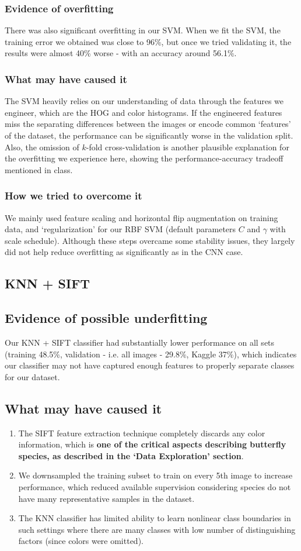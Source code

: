 \documentclass[10pt]{article} %
\begin{document}
\subsubsection{Evidence of overfitting}
There was also significant overfitting in our SVM. When we fit the SVM, the training error we obtained was close to 96\%, but once we tried validating it, the results were almost 40\% worse - with an accuracy around 56.1\%. 
\subsubsection{What may have caused it}
The SVM heavily relies on our understanding of data through the features we engineer, which are the HOG and color histograms. If the engineered features miss the separating differences between the images or encode common `features' of the dataset, the performance can be significantly worse in the validation split. Also, the omission of $k$-fold cross-validation is another plausible explanation for the overfitting we experience here, showing the performance-accuracy tradeoff mentioned in class.
\subsubsection{How we tried to overcome it}
We mainly used feature scaling and horizontal flip augmentation on training data, and `regularization' for our RBF SVM (default parameters $C$ and $\gamma$ with scale schedule). Although these steps overcame some stability issues, they largely did not help reduce overfitting as significantly as in the CNN case.


\subsection{KNN + SIFT}
\subsection{Evidence of possible underfitting}
Our KNN + SIFT classifier had substantially lower performance on all sets (training 48.5\%, validation - i.e. all images - 29.8\%, Kaggle 37\%), which indicates our classifier may not have captured enough features to properly separate classes for our dataset.
\subsection{What may have caused it}\begin{enumerate}
    \item The SIFT feature extraction technique completely discards any color information, which is \textbf{one of the critical aspects describing butterfly species, as described in the `Data Exploration' section}.
    \item We downsampled the training subset to train on every 5th image to increase performance, which reduced available supervision considering species do not have many representative samples in the dataset.
    \item The KNN classifier has limited ability to learn nonlinear class boundaries in such settings where there are many classes with low number of distinguishing factors (since colors were omitted).
\end{enumerate}
\end{document}
